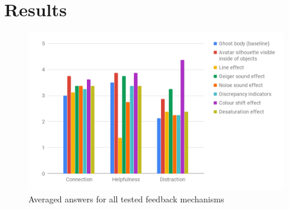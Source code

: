\section{Results}
\begin{figure}[h]
    \centering
    \includegraphics[height=0.4\textheight]{figures/UserStudyAveragedChart}
    \caption{Averaged answers for all tested feedback mechanisms}
    \label{fig:averagedUserStudyChart}
\end{figure}

